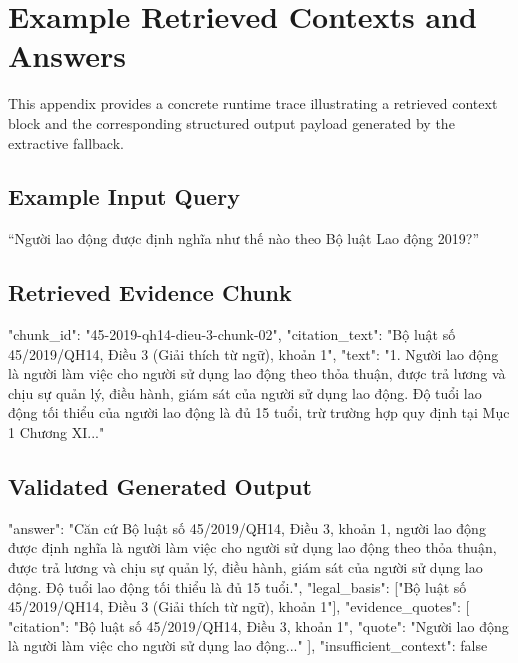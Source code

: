 \chapter{Example Retrieved Contexts and Answers}
\label{app:case-traces}

This appendix provides a concrete runtime trace illustrating a retrieved context block and the corresponding structured output payload generated by the extractive fallback.

\section{Example Input Query}
``Người lao động được định nghĩa như thế nào theo Bộ luật Lao động 2019?''

\section{Retrieved Evidence Chunk}
\begin{ThesisCode}
{
  "chunk_id": "45-2019-qh14-dieu-3-chunk-02",
  "citation_text": "Bộ luật số 45/2019/QH14, Điều 3 (Giải thích từ ngữ), khoản 1",
  "text": "1. Người lao động là người làm việc cho người sử dụng lao động \n  theo thỏa thuận, được trả lương và chịu sự quản lý, điều hành, giám sát \n  của người sử dụng lao động. Độ tuổi lao động tối thiểu của người \n  lao động là đủ 15 tuổi, trừ trường hợp quy định tại Mục 1 Chương XI..."
}
\end{ThesisCode}

\section{Validated Generated Output}
\begin{ThesisCode}
{
  "answer": "Căn cứ Bộ luật số 45/2019/QH14, Điều 3, khoản 1, người lao động \n  được định nghĩa là người làm việc cho người sử dụng lao động theo thỏa thuận, \n  được trả lương và chịu sự quản lý, điều hành, giám sát của người sử \n  dụng lao động. Độ tuổi lao động tối thiểu là đủ 15 tuổi.",
  "legal_basis": ["Bộ luật số 45/2019/QH14, Điều 3 (Giải thích từ ngữ), khoản 1"],
  "evidence_quotes": [
    {
      "citation": "Bộ luật số 45/2019/QH14, Điều 3, khoản 1",
      "quote": "Người lao động là người làm việc cho người sử dụng lao động..."
    }
  ],
  "insufficient_context": false
}
\end{ThesisCode}
